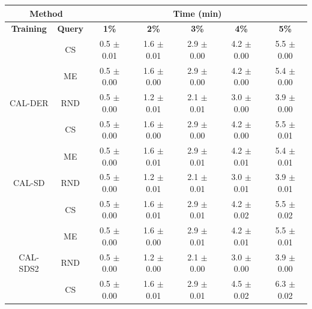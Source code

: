 \begin{table}[htbp]
\centering

\begin{tabular*}{\linewidth}{c|c|@{\extracolsep{\fill}}ccccc}
\toprule
\multicolumn{2}{c|}{\textbf{Method}} & \multicolumn{5}{c}{\textbf{Time (min)}} \\
\midrule
\textbf{Training} & \textbf{Query} & \textbf{1\%} & \textbf{2\%} & \textbf{3\%} & \textbf{4\%} & \textbf{5\%}\\
\midrule
 & CS & 0.5 $\pm$ {\small 0.01} & 1.6 $\pm$ {\small 0.01} & 2.9 $\pm$ {\small 0.00} & 4.2 $\pm$ {\small 0.00} & 5.5 $\pm$ {\small 0.00}\\

 & ME & 0.5 $\pm$ {\small 0.00} & 1.6 $\pm$ {\small 0.00} & 2.9 $\pm$ {\small 0.00} & 4.2 $\pm$ {\small 0.00} & 5.4 $\pm$ {\small 0.00}\\

\multirow{-3}{*}{\raggedright\arraybackslash CAL-DER} & RND & 0.5 $\pm$ {\small 0.00} & 1.2 $\pm$ {\small 0.01} & 2.1 $\pm$ {\small 0.01} & 3.0 $\pm$ {\small 0.00} & 3.9 $\pm$ {\small 0.00}\\
\midrule
 & CS & 0.5 $\pm$ {\small 0.00} & 1.6 $\pm$ {\small 0.00} & 2.9 $\pm$ {\small 0.00} & 4.2 $\pm$ {\small 0.00} & 5.5 $\pm$ {\small 0.01}\\

 & ME & 0.5 $\pm$ {\small 0.00} & 1.6 $\pm$ {\small 0.01} & 2.9 $\pm$ {\small 0.01} & 4.2 $\pm$ {\small 0.01} & 5.4 $\pm$ {\small 0.01}\\

\multirow{-3}{*}{\raggedright\arraybackslash CAL-SD} & RND & 0.5 $\pm$ {\small 0.00} & 1.2 $\pm$ {\small 0.01} & 2.1 $\pm$ {\small 0.01} & 3.0 $\pm$ {\small 0.01} & 3.9 $\pm$ {\small 0.01}\\
\midrule
 & CS & 0.5 $\pm$ {\small 0.00} & 1.6 $\pm$ {\small 0.01} & 2.9 $\pm$ {\small 0.01} & 4.2 $\pm$ {\small 0.02} & 5.5 $\pm$ {\small 0.02}\\

 & ME & 0.5 $\pm$ {\small 0.00} & 1.6 $\pm$ {\small 0.00} & 2.9 $\pm$ {\small 0.01} & 4.2 $\pm$ {\small 0.01} & 5.5 $\pm$ {\small 0.01}\\

\multirow{-3}{*}{\raggedright\arraybackslash CAL-SDS2} & RND & 0.5 $\pm$ {\small 0.00} & 1.2 $\pm$ {\small 0.00} & 2.1 $\pm$ {\small 0.00} & 3.0 $\pm$ {\small 0.00} & 3.9 $\pm$ {\small 0.00}\\
\midrule
 & CS & 0.5 $\pm$ {\small 0.00} & 1.6 $\pm$ {\small 0.01} & 2.9 $\pm$ {\small 0.01} & 4.5 $\pm$ {\small 0.02} & 6.3 $\pm$ {\small 0.02}\\


\end{tabular*}
\end{table}
